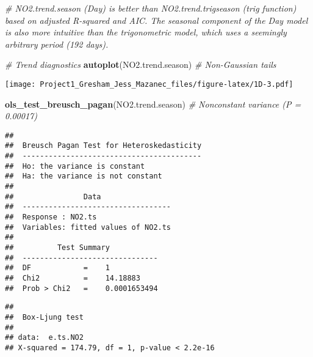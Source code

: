 \documentclass[
]{article}
\newenvironment{Shaded}{\begin{snugshade}}{\end{snugshade}}
\newcommand{\CommentTok}[1]{\textcolor[rgb]{0.56,0.35,0.01}{\textit{#1}}}
\newcommand{\DataTypeTok}[1]{\textcolor[rgb]{0.13,0.29,0.53}{#1}}
\newcommand{\KeywordTok}[1]{\textcolor[rgb]{0.13,0.29,0.53}{\textbf{#1}}}
\newcommand{\NormalTok}[1]{#1}
\newcommand{\OperatorTok}[1]{\textcolor[rgb]{0.81,0.36,0.00}{\textbf{#1}}}
\newcommand{\StringTok}[1]{\textcolor[rgb]{0.31,0.60,0.02}{#1}}
\begin{document}
\begin{Shaded}
\begin{Highlighting}[]
\CommentTok{# NO2.trend.season (Day) is better than NO2.trend.trigseason (trig function) based on adjusted R-squared and AIC. The seasonal component of the Day model is also more intuitive than the trigonometric model, which uses a seemingly arbitrary period (192 days).}

\CommentTok{# Trend diagnostics}
\KeywordTok{autoplot}\NormalTok{(NO2.trend.season) }\CommentTok{# Non-Gaussian tails}
\end{Highlighting}
\end{Shaded}

\texttt{[image: Project1\_Gresham\_Jess\_Mazanec\_files/figure-latex/1D-3.pdf]}

\begin{Shaded}
\begin{Highlighting}[]
\KeywordTok{ols_test_breusch_pagan}\NormalTok{(NO2.trend.season) }\CommentTok{# Nonconstant variance (P = 0.00017)}
\end{Highlighting}
\end{Shaded}

\begin{verbatim}
## 
##  Breusch Pagan Test for Heteroskedasticity
##  -----------------------------------------
##  Ho: the variance is constant            
##  Ha: the variance is not constant        
## 
##                Data                
##  ----------------------------------
##  Response : NO2.ts 
##  Variables: fitted values of NO2.ts 
## 
##          Test Summary           
##  -------------------------------
##  DF            =    1 
##  Chi2          =    14.18883 
##  Prob > Chi2   =    0.0001653494
\end{verbatim}

\begin{Shaded}
\end{Shaded}

\begin{verbatim}
## 
##  Box-Ljung test
## 
## data:  e.ts.NO2
## X-squared = 174.79, df = 1, p-value < 2.2e-16
\end{verbatim}
\end{document}
